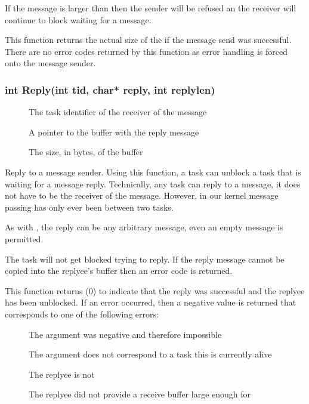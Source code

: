 \documentclass[pdftex,10pt,a4paper]{article}
\begin{document}
If the message is larger than  then the sender will be
refused an the receiver will continue to block waiting for a message.

This function returns the actual size of the  if the
message send was successful. There are no error codes returned by this
function as error handling is forced onto the message sender.


\subsubsection*{int Reply(int tid, char* reply, int replylen)}

\begin{description}
\item[] The task identifier of the receiver of the message
\item[] A pointer to the buffer with the reply message
\item[] The size, in bytes, of the  buffer
\end{description}

Reply to a message sender. Using this function, a task can unblock a
task that is  waiting for a message
reply. Technically, any task can reply to a message, it does not have
to be the receiver of the message. However, in our kernel message
passing has only ever been between two tasks.

As with , the reply can be any arbitrary message, even an
empty message is permitted.

The task will not get blocked trying to reply. If the reply message
cannot be copied into the replyee's buffer then an error code is
returned.

This function returns  ($0$) to indicate that the reply was
successful and the replyee has been unblocked. If an error occurred,
then a negative value is returned that corresponds to one of the
following errors:

\begin{description}
\item[] The  argument was negative
  and therefore impossible
\item[] The  argument does not
  correspond to a task this is currently alive
\item[] The replyee is not 
\item[] The replyee did not provide a
  receive buffer large enough for 
\end{description}
\end{document}
